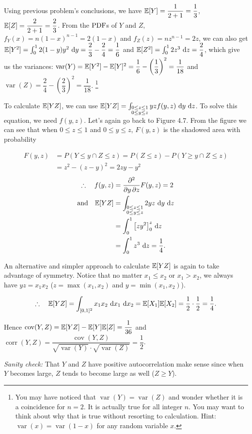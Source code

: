 \begin{solution}
Using previous problem's conclusions, we have $\mathbb{E}[Y]=\dfrac{1}{2+1}=\dfrac{1}{3}$,
$\mathbb{E}[Z]=\dfrac{2}{2+1}=\dfrac{2}{3}$. From the \(\mathrm{PDF}\)s of $Y$ and $Z$,
$f_Y(x)=n(1-x)^{n-1}=2(1-x)$ and $f_Z(z)=nz^{n-1}=2z$, we can also get
$\mathbb{E}[Y^2]=\int_0^1 2(1-y)y^2\,\mathop{}\!\mathrm{d} y=\dfrac{2}{3}-\dfrac{2}{4}=\dfrac{1}{6}$ and
$\mathbb{E}[Z^2]=\int_0^1 2z^3\,\mathop{}\!\mathrm{d} z=\dfrac{2}{4}$, which give us the variances:
$\operatorname{var}(Y)=\mathbb{E}[Y^2]-\mathbb{E}[Y]^2=\dfrac{1}{6}-\left(\dfrac{1}{3}\right)^2=\dfrac{1}{18}$
and $\operatorname{var}(Z)=\dfrac{2}{4}-\left(\dfrac{2}{3}\right)^2=\dfrac{1}{18}$.
\footnote[33]{You may have noticed that $\operatorname{var}(Y)=\operatorname{var}(Z)$ and wonder
whether it is a coincidence for $n=2$. It is actually true for all integer $n$. You may
want to think about why that is true without resorting to calculation. Hint:
$\operatorname{var}(x)=\operatorname{var}(1-x)$ for any random variable $x$.}

To calculate $\mathbb{E}[YZ]$, we can use
$\mathbb{E}[YZ]=\int_{\substack{0\le z\le1\\0\le y\le z}} yz f(y,z)\,\mathop{}\!\mathrm{d} y\,\mathop{}\!\mathrm{d} z$. To solve
this equation, we need $f(y,z)$. Let's again go back to Figure 4.7. From the figure we
can see that when $0\leq z\leq1$ and $0\leq y\leq z$, $F(y,z)$ is the shadowed area with
probability

\[
\begin{aligned}
F(y,z)&=P(Y\leq y\cap Z\leq z)=P(Z\leq z)-P(Y\geq y\cap Z\leq z)\\
&=z^2-(z-y)^2=2zy-y^2
\end{aligned}
\]
\[
\begin{aligned}
\therefore\quad f(y,z)&=\frac{\partial^2}{\partial y\,\partial z}F(y,z)=2
\\
\text{and}\quad \mathbb{E}[YZ]&=\int_{\substack{0\le z\le1\\0\le y\le z}}2yz\,\mathop{}\!\mathrm{d} y\,\mathop{}\!\mathrm{d} z\\
&=\int_0^1\left[zy^2\right]_0^z\,\mathop{}\!\mathrm{d} z\\
&=\int_0^1z^3\,\mathop{}\!\mathrm{d} z=\frac{1}{4}.
\end{aligned}
\]


An alternative and simpler approach to calculate $\mathbb{E}[YZ]$ is again to take advantage of
symmetry. Notice that no matter $x_1\leq x_2$ or $x_1>x_2$, we always have
$yz=x_1x_2$ ($z=\max(x_1,x_2)$ and $y=\min(x_1,x_2)$).

\[
\therefore\quad \mathbb{E}[YZ]=\int_{[0,1]^2}x_1x_2\,\mathop{}\!\mathrm{d} x_1\,\mathop{}\!\mathrm{d} x_2
=\mathbb{E}[X_1]\mathbb{E}[X_2]=\frac{1}{2}\cdot\frac{1}{2}=\frac{1}{4}.
\]

Hence $\operatorname{cov}(Y,Z)=\mathbb{E}[YZ]-\mathbb{E}[Y]\mathbb{E}[Z]=\dfrac{1}{36}$ and
$\operatorname{corr}(Y,Z)=\dfrac{\operatorname{cov}(Y,Z)}{\sqrt{\operatorname{var}(Y)}\cdot
\sqrt{\operatorname{var}(Z)}}=\dfrac{1}{2}$.

\emph{Sanity check:} That $Y$ and $Z$ have positive autocorrelation make sense since
when $Y$ becomes large, $Z$ tends to become large as well ($Z\geq Y$).
\end{solution}

